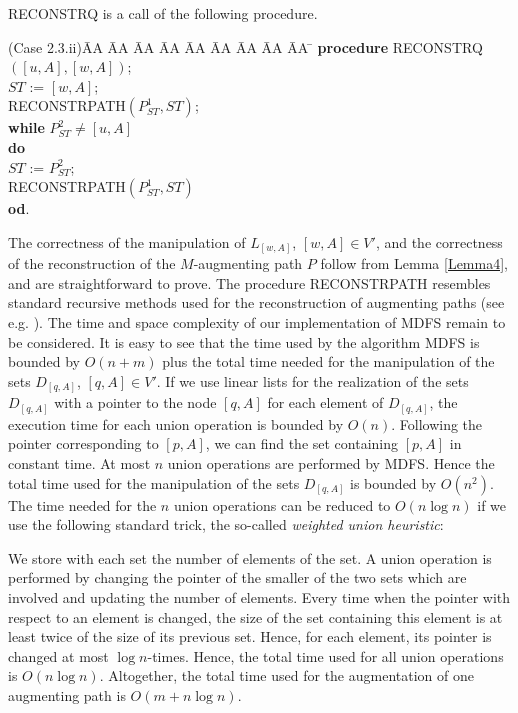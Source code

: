 \documentclass[12pt,twoside,a4paper]{article}
\begin{document}
\noindent
RECONSTRQ is a call of the following procedure.
\begin{tabbing}
(Case 2.3.ii)\= AA \= AA \= AA \= AA \= AA \= AA \= AA \= AA \= AA \= \kill
\> {\bf procedure} RECONSTRQ$([u,A],[w,A])$; \\
\> $ST$ := $[w,A]$; \\
\> RECONSTRPATH$(P^1_{ST},ST)$; \\ 
\> {\bf while} $P^2_{ST} \not= [u,A]$ \\
\> {\bf do} \\
\> \> $ST$ := $P^2_{ST}$; \\
\> \> RECONSTRPATH$(P^1_{ST},ST)$  \\
\> {\bf od}. \\
\end{tabbing}

\medskip
\noindent
The correctness of the manipulation of $L_{[w,A]}$, 
$[w,A]\in V'$, and the correctness of the reconstruction of the $M$-augmenting
path $P$ follow from Lemma \ref{Lemma4}, and are straightforward to prove.
The procedure RECONSTRPATH resembles standard recursive methods used for
the reconstruction of augmenting paths (see e.g. \cite{Ta}).
The time and space complexity of our implementation of MDFS remain to be
considered. It is easy to see that the time used by the algorithm MDFS is bounded
by $O(n+m)$ plus the total time needed for the manipulation of the sets
$D_{[q,A]}$, $[q,A] \in V'$.
If we use linear lists for the realization of the sets $D_{[q,A]}$ with a 
pointer to the node $[q,A]$ for each element of $D_{[q,A]}$, the 
execution time for each union operation is bounded by $O(n)$. Following the 
pointer corresponding to $[p,A]$, we can find the set containing $[p,A]$ 
in constant time.
At most $n$ union operations are performed by MDFS. 
Hence the total time used for the manipulation of the sets $D_{[q,A]}$ is 
bounded by $O(n^2)$. The time needed for the $n$ union operations can be 
reduced to $O(n \log n)$ if we use the following standard trick,
the so-called {\em weighted union heuristic\/}:

\medskip
We store with each set the number of elements of the set. A union operation 
is performed by changing the pointer of the smaller of the two sets which are
involved and updating the number of elements. Every time when the pointer with 
respect to an element is changed,
the size of the set containing this element is at least twice of the size of
its previous set. Hence, for each element, its pointer is changed at most
$\log n$-times. Hence, the total time used for all union operations is 
$O(n \log n)$. Altogether, the total time used for the augmentation of one 
augmenting path is $O(m + n \log n)$.
\end{document}
